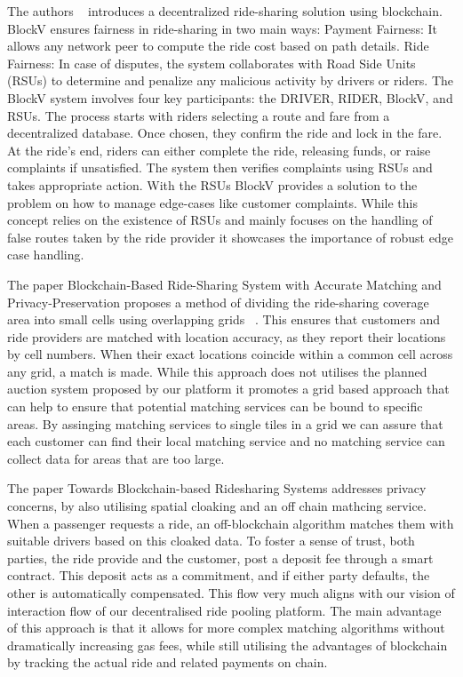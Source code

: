 The authors ~\cite{Pal.}  introduces a decentralized ride-sharing solution using blockchain. BlockV ensures fairness in ride-sharing in two main ways:
Payment Fairness: It allows any network peer to compute the ride cost based on path details.
Ride Fairness: In case of disputes, the system collaborates with Road Side Units (RSUs) to determine and penalize any malicious activity by drivers or riders.
The BlockV system involves four key participants: the DRIVER, RIDER, BlockV, and RSUs. The process starts with riders selecting a route and fare from a decentralized database. Once chosen, they confirm the ride and lock in the fare. At the ride's end, riders can either complete the ride, releasing funds, or raise complaints if unsatisfied. The system then verifies complaints using RSUs and takes appropriate action.
With the RSUs BlockV provides a solution to the problem on how to manage edge-cases like customer complaints. While this concept relies on the existence of RSUs and mainly focuses on the handling of false routes taken by the ride provider it showcases the importance of robust edge case handling.

The paper Blockchain-Based Ride-Sharing System with Accurate Matching and Privacy-Preservation proposes a method of dividing the ride-sharing coverage area into small cells using overlapping grids ~\cite{Badr.}. This ensures that customers and ride providers are matched with location accuracy, as they report their locations by cell numbers. When their exact locations coincide within a common cell across any grid, a match is made. While this approach does not utilises the planned auction system proposed by our platform it promotes a grid based approach that can help to ensure that potential matching services can be bound to specific areas. By assinging matching services to single tiles in a grid we can assure that each customer can find their local matching service and no matching service can collect data for areas that are too large.


The paper Towards Blockchain-based Ridesharing Systems addresses privacy concerns, by also utilising spatial cloaking and an off chain mathcing service.~\cite{Vazquez.} When a passenger requests a ride, an off-blockchain algorithm matches them with suitable drivers based on this cloaked data. To foster a sense of trust, both parties, the ride provide and the customer, post a deposit fee through a smart contract. This deposit acts as a commitment, and if either party defaults, the other is automatically compensated. This flow very much aligns with our vision of interaction flow of our decentralised ride pooling platform. The main advantage of this approach is that it allows for more complex matching algorithms without dramatically increasing gas fees, while still utilising the advantages of blockchain by tracking the actual ride and related payments on chain. 

